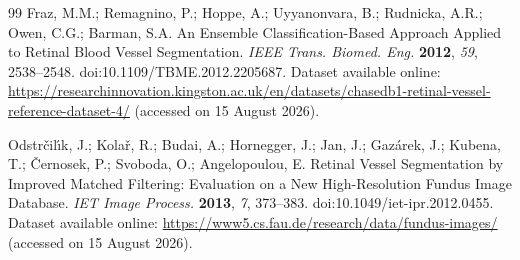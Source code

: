 \documentclass[jimaging,article,submit,pdftex,moreauthors]{Definitions/mdpi}%
\providecommand{\href}[2]{#2}
\begin{document}
\begin{thebibliography}{99}
Fraz, M.M.; Remagnino, P.; Hoppe, A.; Uyyanonvara, B.; Rudnicka, A.R.; Owen, C.G.; Barman, S.A. An Ensemble Classification-Based Approach Applied to Retinal Blood Vessel Segmentation. \textit{IEEE Trans. Biomed. Eng.} \textbf{2012}, \textit{59}, 2538--2548. \href{https://doi.org/10.1109/TBME.2012.2205687}{doi:10.1109/TBME.2012.2205687}. Dataset available online: \url{https://researchinnovation.kingston.ac.uk/en/datasets/chasedb1-retinal-vessel-reference-dataset-4/} (accessed on 15 August 2026).




Odstr\v{c}il\'{\i}k, J.; Kola\v{r}, R.; Budai, A.; Hornegger, J.; Jan, J.; Gaz\'arek, J.; Kubena, T.; \v{C}ernosek, P.; Svoboda, O.; Angelopoulou, E. Retinal Vessel Segmentation by Improved Matched Filtering: Evaluation on a New High-Resolution Fundus Image Database. \textit{IET Image Process.} \textbf{2013}, \textit{7}, 373--383. \href{https://doi.org/10.1049/iet-ipr.2012.0455}{doi:10.1049/iet-ipr.2012.0455}. Dataset available online: \url{https://www5.cs.fau.de/research/data/fundus-images/} (accessed on 15 August 2026).

\end{thebibliography}



\ifmdpiclass\PublishersNote{}\fi




\end{document}
